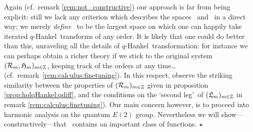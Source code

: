 {\small
\begin{remark} \label{rem:qHankel:finetuning} \rm
Again (cf.\ remark \ref{rem:not_constructive}) our approach
is far from being explicit: still we lack any criterion which
describes the spaces \Hintersect\ and \Hcore\ in a direct way; we
merely {\em define\/} \Hcore\ to be the largest space on which one
can happily take iterated \mbox{$q$-Hankel}\ transforms of any order.
It is likely that one could do better than this, unraveling all the
details of \mbox{$q$-Hankel}\ transformation: for instance we
can perhaps obtain a richer theory if we stick to the original
system $({\mathcal R}_{m},\mathfrak{H}_{m})_{m\in \mathbb{Z}}$, keeping track of the
orders at any time\ldots (cf.\ \mbox{remark \ref{rem:calculus:finetuning}}).
In this respect, observe the striking similarity between the properties of
$({\mathcal R}_{m})_{m\in \mathbb{Z}}$ given in proposition \ref{prop:holqHankel:qdiff},
and the conditions on the \lq second leg\rq\ of
$(\mathfrak{L}_m)_{m\in\mathbb{Z}}$ in remark \ref{rem:calculus:finetuning}).
Our main concern however, is to proceed into harmonic analysis on the quantum $E(2)$ group.
Nevertheless we will show---constructively---that \Hcore\ contains an
important class of functions.
$\hfill \star$
\end{remark}
}
